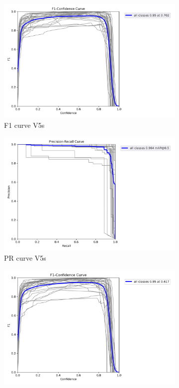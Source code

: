 \documentclass[letterpaper,11pt]{report}
\begin{document}
\begin{figure}[h!]
    \centering
    \begin{subfigure}[t]{0.4\textwidth}
        \centering
        \includegraphics[width=\textwidth]{F1_curve_v5s.png}
        \caption{F1 curve V5s}
        \label{fig:image1}
    \end{subfigure}
    \hfill
    \begin{subfigure}[t]{0.4\textwidth}
        \centering
        \includegraphics[width=\textwidth]{PR_curve_v5s.png}
        \caption{PR curve V5s}
        \label{fig:image2}
    \end{subfigure}
    \hfill
    \begin{subfigure}[t]{0.4\textwidth}
        \centering
        \includegraphics[width=\textwidth]{F1_curve_v5x.png}

\end{subfigure}
\end{figure}
\end{document}
